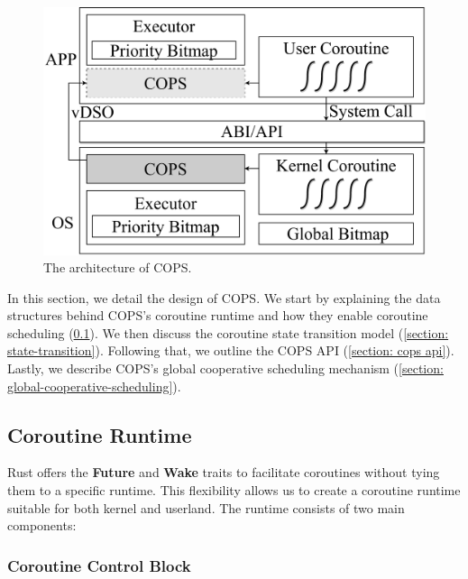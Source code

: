\documentclass[conference]{IEEEtran}
\begin{document}
\begin{figure}[tbp]
  \centering
  \includegraphics[width=\linewidth]{assets/arch.pdf}
  \caption{The architecture of COPS.}
  \label{fig:arch}
  \vspace{-1em}
\end{figure}

In this section, we detail the design of COPS. We start by explaining the data structures behind COPS's coroutine runtime and how they enable coroutine scheduling (\ref{section: Coroutine Runtime}). We then discuss the coroutine state transition model (\ref{section: state-transition}). Following that, we outline the COPS API (\ref{section: cops api}). Lastly, we describe COPS's global cooperative scheduling mechanism (\ref{section: global-cooperative-scheduling}).

\subsection{Coroutine Runtime}
\label{section: Coroutine Runtime}

Rust offers the \textbf{Future} and \textbf{Wake} traits to facilitate coroutines without tying them to a specific runtime. This flexibility allows us to create a coroutine runtime suitable for both kernel and userland. The runtime consists of two main components: 

\subsubsection{Coroutine Control Block}
\end{document}
